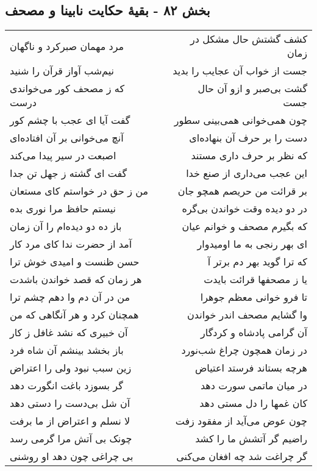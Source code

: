 \begin{center}
\section*{بخش ۸۲ - بقیهٔ حکایت نابینا و مصحف}
\label{sec:sh082}
\begin{longtable}{l p{0.5cm} r}
مرد مهمان صبرکرد و ناگهان
&&
کشف گشتش حال مشکل در زمان
\\
نیم‌شب آواز قرآن را شنید
&&
جست از خواب آن عجایب را بدید
\\
که ز مصحف کور می‌خواندی درست
&&
گشت بی‌صبر و ازو آن حال جست
\\
گفت آیا ای عجب با چشم کور
&&
چون همی‌خوانی همی‌بینی سطور
\\
آنچ می‌خوانی بر آن افتاده‌ای
&&
دست را بر حرف آن بنهاده‌ای
\\
اصبعت در سیر پیدا می‌کند
&&
که نظر بر حرف داری مستند
\\
گفت ای گشته ز جهل تن جدا
&&
این عجب می‌داری از صنع خدا
\\
من ز حق در خواستم کای مستعان
&&
بر قرائت من حریصم همچو جان
\\
نیستم حافظ مرا نوری بده
&&
در دو دیده وقت خواندن بی‌گره
\\
باز ده دو دیده‌ام را آن زمان
&&
که بگیرم مصحف و خوانم عیان
\\
آمد از حضرت ندا کای مرد کار
&&
ای بهر رنجی به ما اومیدوار
\\
حسن ظنست و امیدی خوش ترا
&&
که ترا گوید بهر دم برتر آ
\\
هر زمان که قصد خواندن باشدت
&&
یا ز مصحفها قرائت بایدت
\\
من در آن دم وا دهم چشم ترا
&&
تا فرو خوانی معظم جوهرا
\\
همچنان کرد و هر آنگاهی که من
&&
وا گشایم مصحف اندر خواندن
\\
آن خبیری که نشد غافل ز کار
&&
آن گرامی پادشاه و کردگار
\\
باز بخشد بینشم آن شاه فرد
&&
در زمان همچون چراغ شب‌نورد
\\
زین سبب نبود ولی را اعتراض
&&
هرچه بستاند فرستد اعتیاض
\\
گر بسوزد باغت انگورت دهد
&&
در میان ماتمی سورت دهد
\\
آن شل بی‌دست را دستی دهد
&&
کان غمها را دل مستی دهد
\\
لا نسلم و اعتراض از ما برفت
&&
چون عوض می‌آید از مفقود زفت
\\
چونک بی آتش مرا گرمی رسد
&&
راضیم گر آتشش ما را کشد
\\
بی چراغی چون دهد او روشنی
&&
گر چراغت شد چه افغان می‌کنی
\\
\end{longtable}
\end{center}
